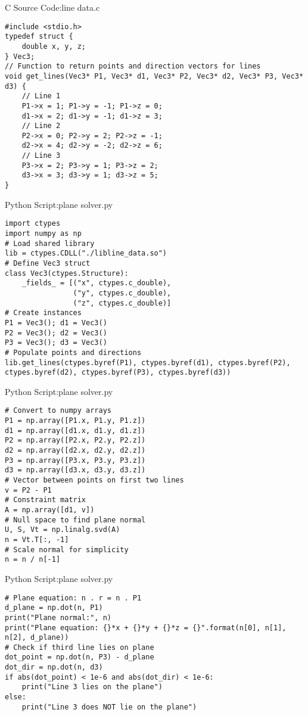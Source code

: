 \documentclass{beamer}
\numberwithin{equation}{section}
\theoremstyle{remark}
\begin{document}
\begin{frame}[fragile]{C Source Code:line data.c}
\begin{verbatim}
#include <stdio.h>
typedef struct {
    double x, y, z;
} Vec3;
// Function to return points and direction vectors for lines
void get_lines(Vec3* P1, Vec3* d1, Vec3* P2, Vec3* d2, Vec3* P3, Vec3* d3) {
    // Line 1
    P1->x = 1; P1->y = -1; P1->z = 0;
    d1->x = 2; d1->y = -1; d1->z = 3;
    // Line 2
    P2->x = 0; P2->y = 2; P2->z = -1;
    d2->x = 4; d2->y = -2; d2->z = 6;
    // Line 3
    P3->x = 2; P3->y = 1; P3->z = 2;
    d3->x = 3; d3->y = 1; d3->z = 5;
}
\end{verbatim}
\end{frame}

\begin{frame}[fragile]{Python Script:plane solver.py}
\begin{verbatim}
import ctypes
import numpy as np
# Load shared library
lib = ctypes.CDLL("./libline_data.so")
# Define Vec3 struct
class Vec3(ctypes.Structure):
    _fields_ = [("x", ctypes.c_double),
                ("y", ctypes.c_double),
                ("z", ctypes.c_double)]
# Create instances
P1 = Vec3(); d1 = Vec3()
P2 = Vec3(); d2 = Vec3()
P3 = Vec3(); d3 = Vec3()
# Populate points and directions
lib.get_lines(ctypes.byref(P1), ctypes.byref(d1), ctypes.byref(P2), ctypes.byref(d2), ctypes.byref(P3), ctypes.byref(d3))
\end{verbatim}
\end{frame}
\begin{frame}[fragile]{Python Script:plane solver.py}
\begin{verbatim}
# Convert to numpy arrays
P1 = np.array([P1.x, P1.y, P1.z])
d1 = np.array([d1.x, d1.y, d1.z])
P2 = np.array([P2.x, P2.y, P2.z])
d2 = np.array([d2.x, d2.y, d2.z])
P3 = np.array([P3.x, P3.y, P3.z])
d3 = np.array([d3.x, d3.y, d3.z])
# Vector between points on first two lines
v = P2 - P1
# Constraint matrix
A = np.array([d1, v])
# Null space to find plane normal
U, S, Vt = np.linalg.svd(A)
n = Vt.T[:, -1]
# Scale normal for simplicity
n = n / n[-1]
\end{verbatim}
\end{frame}
\begin{frame}[fragile]{Python Script:plane solver.py}
\begin{verbatim}
# Plane equation: n . r = n . P1
d_plane = np.dot(n, P1)
print("Plane normal:", n)
print("Plane equation: {}*x + {}*y + {}*z = {}".format(n[0], n[1], n[2], d_plane))
# Check if third line lies on plane
dot_point = np.dot(n, P3) - d_plane
dot_dir = np.dot(n, d3)
if abs(dot_point) < 1e-6 and abs(dot_dir) < 1e-6:
    print("Line 3 lies on the plane")
else:
    print("Line 3 does NOT lie on the plane")

\end{verbatim}
\end{frame}
\end{document}

